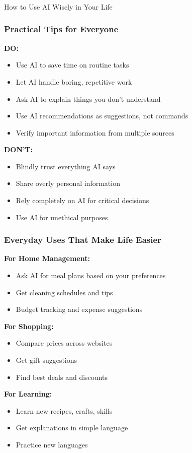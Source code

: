 \begin{frame}[fragile]\frametitle{}
\begin{center}
{\Large How to Use AI Wisely in Your Life}
\end{center}
\end{frame}

\begin{frame}[fragile]\frametitle{Practical Tips for Everyone}

{\bf DO:}
\begin{itemize}
\item Use AI to save time on routine tasks
\item Let AI handle boring, repetitive work
\item Ask AI to explain things you don't understand
\item Use AI recommendations as suggestions, not commands
\item Verify important information from multiple sources
\end{itemize}

{\bf DON'T:}
\begin{itemize}
\item Blindly trust everything AI says
\item Share overly personal information
\item Rely completely on AI for critical decisions
\item Use AI for unethical purposes
\end{itemize}
\end{frame}

\begin{frame}[fragile]\frametitle{Everyday Uses That Make Life Easier}

{\bf For Home Management:}
\begin{itemize}
\item Ask AI for meal plans based on your preferences
\item Get cleaning schedules and tips
\item Budget tracking and expense suggestions
\end{itemize}

{\bf For Shopping:}
\begin{itemize}
\item Compare prices across websites
\item Get gift suggestions
\item Find best deals and discounts
\end{itemize}

{\bf For Learning:}
\begin{itemize}
\item Learn new recipes, crafts, skills
\item Get explanations in simple language
\item Practice new languages
\end{itemize}
\end{frame}

